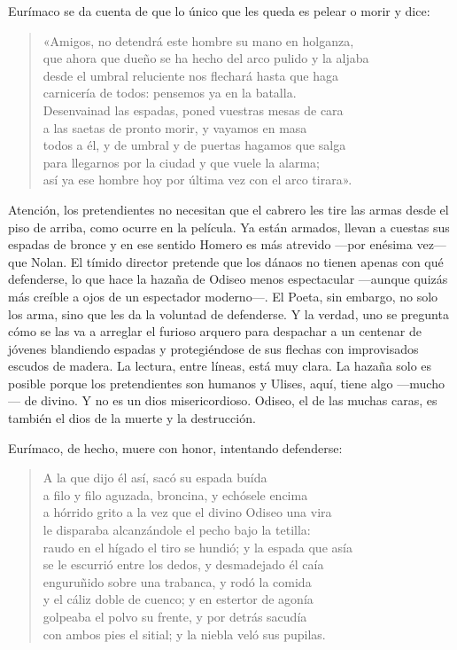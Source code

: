 Eurímaco se da cuenta de que lo único que les queda es pelear o morir y dice:

\begin{verse}
«Amigos, no detendrá este hombre su mano en holganza,\\
que ahora que dueño se ha hecho del arco pulido y la aljaba\\
desde el umbral reluciente nos flechará hasta que haga\\
carnicería de todos: pensemos ya en la batalla.\\
Desenvainad las espadas, poned vuestras mesas de cara\\
a las saetas de pronto morir, y vayamos en masa\\
todos a él, y de umbral y de puertas hagamos que salga\\
para llegarnos por la ciudad y que vuele la alarma;\\
así ya ese hombre hoy por última vez con el arco tirara».
\end{verse}

Atención, los pretendientes no necesitan que el cabrero les tire las armas desde el piso de arriba, como ocurre en la película. Ya están armados, llevan a cuestas sus espadas de bronce y en ese sentido Homero es más atrevido ---por enésima vez--- que Nolan. El tímido director pretende que los dánaos no tienen apenas con qué defenderse, lo que hace la hazaña de Odiseo menos espectacular ---aunque quizás más creíble a ojos de un espectador moderno---. El Poeta, sin embargo, no solo los arma, sino que les da la voluntad de defenderse. Y la verdad, uno se pregunta cómo se las va a arreglar el furioso arquero para despachar a un centenar de jóvenes blandiendo espadas y protegiéndose de sus flechas con improvisados escudos de madera. La lectura, entre líneas, está muy clara. La hazaña solo es posible porque los pretendientes son humanos y Ulises, aquí, tiene algo ---mucho--- de divino. Y no es un dios misericordioso. Odiseo, el de las muchas caras, es también el dios de la muerte y la destrucción.

Eurímaco, de hecho, muere con honor, intentando defenderse:

\begin{verse}
A la que dijo él así, sacó su espada buída\\
a filo y filo aguzada, broncina, y echósele encima\\
a hórrido grito a la vez que el divino Odiseo una vira\\
le disparaba alcanzándole el pecho bajo la tetilla:\\
raudo en el hígado el tiro se hundió; y la espada que asía\\
se le escurrió entre los dedos, y desmadejado él caía\\
enguruñido sobre una trabanca, y rodó la comida\\
y el cáliz doble de cuenco; y en estertor de agonía\\
golpeaba el polvo su frente, y por detrás sacudía\\
con ambos pies el sitial; y la niebla veló sus pupilas.
\end{verse}

